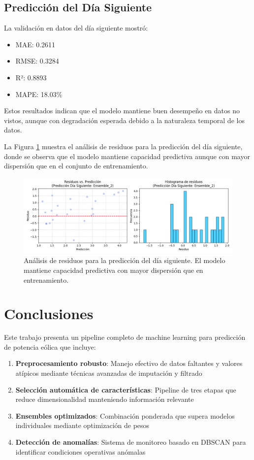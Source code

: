 \documentclass[conference]{IEEEtran}
\begin{document}
	\subsection{Predicción del Día Siguiente}
	La validación en datos del día siguiente mostró:
	\begin{itemize}
		\item MAE: 0.2611
		\item RMSE: 0.3284
		\item R²: 0.8893
		\item MAPE: 18.03\%
	\end{itemize}
	
	Estos resultados indican que el modelo mantiene buen desempeño en datos no vistos, aunque con degradación esperada debido a la naturaleza temporal de los datos.
	
	La Figura \ref{fig:residuos_prediccion} muestra el análisis de residuos para la predicción del día siguiente, donde se observa que el modelo mantiene capacidad predictiva aunque con mayor dispersión que en el conjunto de entrenamiento.
	
	\begin{figure}[htbp]
		\centering
		\includegraphics[width=0.9\linewidth]{images/Figure_7.png}
		\caption{Análisis de residuos para la predicción del día siguiente. El modelo mantiene capacidad predictiva con mayor dispersión que en entrenamiento.}
		\label{fig:residuos_prediccion}
	\end{figure}
	
	\section{Conclusiones}
	
	Este trabajo presenta un pipeline completo de machine learning para predicción de potencia eólica que incluye:
	
	\begin{enumerate}
		\item \textbf{Preprocesamiento robusto}: Manejo efectivo de datos faltantes y valores atípicos mediante técnicas avanzadas de imputación y filtrado
		\item \textbf{Selección automática de características}: Pipeline de tres etapas que reduce dimensionalidad manteniendo información relevante
		\item \textbf{Ensembles optimizados}: Combinación ponderada que supera modelos individuales mediante optimización de pesos
		\item \textbf{Detección de anomalías}: Sistema de monitoreo basado en DBSCAN para identificar condiciones operativas anómalas
	\end{enumerate}
	
\end{document}
